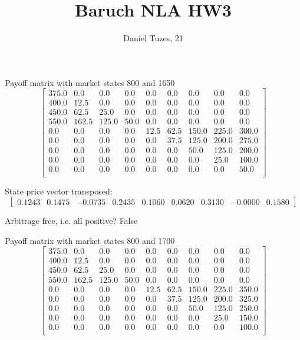 \documentclass{article}
\title{Baruch NLA HW3}
\author{Daniel Tuzes, 21}
\begin{document}
\maketitle
\section{}
Payoff matrix with market states 800 and 1650
\[
    \begin{bmatrix}
        375.0 & 0.0   & 0.0   & 0.0  & 0.0  & 0.0  & 0.0   & 0.0   & 0.0   \\
        400.0 & 12.5  & 0.0   & 0.0  & 0.0  & 0.0  & 0.0   & 0.0   & 0.0   \\
        450.0 & 62.5  & 25.0  & 0.0  & 0.0  & 0.0  & 0.0   & 0.0   & 0.0   \\
        550.0 & 162.5 & 125.0 & 50.0 & 0.0  & 0.0  & 0.0   & 0.0   & 0.0   \\
        0.0   & 0.0   & 0.0   & 0.0  & 12.5 & 62.5 & 150.0 & 225.0 & 300.0 \\
        0.0   & 0.0   & 0.0   & 0.0  & 0.0  & 37.5 & 125.0 & 200.0 & 275.0 \\
        0.0   & 0.0   & 0.0   & 0.0  & 0.0  & 0.0  & 50.0  & 125.0 & 200.0 \\
        0.0   & 0.0   & 0.0   & 0.0  & 0.0  & 0.0  & 0.0   & 25.0  & 100.0 \\
        0.0   & 0.0   & 0.0   & 0.0  & 0.0  & 0.0  & 0.0   & 0.0   & 50.0  \\
    \end{bmatrix}
\]

State price vector transposed: \[
    \begin{bmatrix} 0.1243 & 0.1475 & -0.0735 & 0.2435 & 0.1060 & 0.0620 & 0.3130 & -0.0000 & 0.1580 \end{bmatrix}
\]

Arbitrage free, i.e. all positive? False

Payoff matrix with market states 800 and 1700
\[
    \begin{bmatrix}
        375.0 & 0.0   & 0.0   & 0.0  & 0.0  & 0.0  & 0.0   & 0.0   & 0.0   \\
        400.0 & 12.5  & 0.0   & 0.0  & 0.0  & 0.0  & 0.0   & 0.0   & 0.0   \\
        450.0 & 62.5  & 25.0  & 0.0  & 0.0  & 0.0  & 0.0   & 0.0   & 0.0   \\
        550.0 & 162.5 & 125.0 & 50.0 & 0.0  & 0.0  & 0.0   & 0.0   & 0.0   \\
        0.0   & 0.0   & 0.0   & 0.0  & 12.5 & 62.5 & 150.0 & 225.0 & 350.0 \\
        0.0   & 0.0   & 0.0   & 0.0  & 0.0  & 37.5 & 125.0 & 200.0 & 325.0 \\
        0.0   & 0.0   & 0.0   & 0.0  & 0.0  & 0.0  & 50.0  & 125.0 & 250.0 \\
        0.0   & 0.0   & 0.0   & 0.0  & 0.0  & 0.0  & 0.0   & 25.0  & 150.0 \\
        0.0   & 0.0   & 0.0   & 0.0  & 0.0  & 0.0  & 0.0   & 0.0   & 100.0 \\
    \end{bmatrix}
\]
\end{document}
